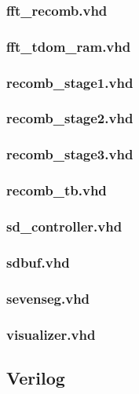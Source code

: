 \documentclass{article}
\begin{document}
	\subsubsection{fft\_recomb.vhd}
	
	\subsubsection{fft\_tdom\_ram.vhd}
	
	\subsubsection{recomb\_stage1.vhd}
	
	\subsubsection{recomb\_stage2.vhd}
	
	\subsubsection{recomb\_stage3.vhd}
	
	\subsubsection{recomb\_tb.vhd}
	
	\subsubsection{sd\_controller.vhd}
	
	\subsubsection{sdbuf.vhd}
	
	\subsubsection{sevenseg.vhd}
	
	\subsubsection{visualizer.vhd}
	

\subsection{Verilog}
\end{document}
